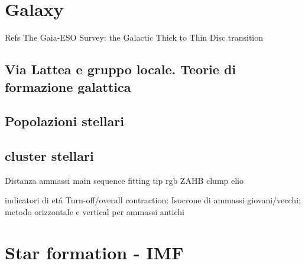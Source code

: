 \section{Galaxy}

\begin{frame}{Refs}
The Gaia-ESO Survey: the Galactic Thick to Thin Disc transition
\end{frame}

\subsection{Via Lattea e gruppo locale. Teorie di formazione galattica}

\subsection{Popolazioni stellari}

\subsection{cluster stellari}

\begin{frame}{Distanza ammassi}
main sequence fitting
tip rgb
ZAHB
clump elio
\end{frame}

\begin{frame}{indicatori di et\'a}
Turn-off/overall contraction: Isocrone di ammassi giovani/vecchi; metodo orizzontale e vertical per ammassi antichi
\end{frame}

\section{Star formation - IMF}

